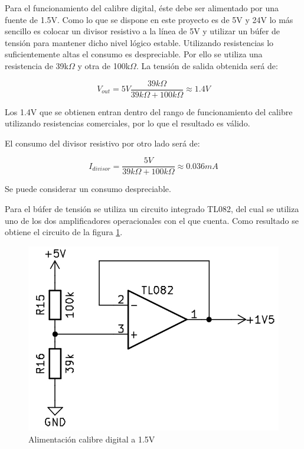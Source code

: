 Para el funcionamiento del calibre digital, éste debe ser alimentado por una fuente de 1.5V. Como lo que se
dispone en este proyecto es de 5V y 24V lo más sencillo es colocar un divisor resistivo a la línea de 5V y
utilizar un búfer de tensión para mantener dicho nivel lógico estable. Utilizando resistencias lo suficientemente
altas el consumo es despreciable. Por ello se utiliza una resistencia de 39k$\Omega$ y otra de 100k$\Omega$. La 
tensión de salida obtenida será de:

\begin{equation}
    V_{out} = 5V \frac{39k\Omega}{39k\Omega+100k\Omega} \approx 1.4V
\end{equation}

Los 1.4V que se obtienen entran dentro del rango de funcionamiento del calibre utilizando resistencias comerciales,
por lo que el resultado es válido. 

El consumo del divisor resistivo por otro lado será de:

\begin{equation}
    I_{divisor} = \frac{5V}{39k\Omega+100k\Omega} \approx 0.036 mA
\end{equation}

Se puede considerar un consumo despreciable.

Para el búfer de tensión se utiliza un circuito integrado TL082, del cual se utiliza uno de los dos amplificadores
operacionales con el que cuenta. Como resultado se obtiene el circuito de la figura \ref{fig:alimcal}.

\begin{figure}[hbtp]
    \centering
    \includegraphics[width=\textwidth/2]{03-placa/04-alimentacion-calibre.png}
    \caption{Alimentación calibre digital a 1.5V}
    \label{fig:alimcal}
    \end{figure}

